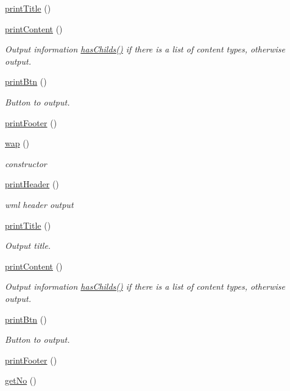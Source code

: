 \begin{DoxyCompactItemize}
\hyperlink{classwap_a048fa1324853c9d69e795c7d34f7ad8b}{print\-Title} ()
\item 
\hyperlink{classwap_a1edebe2b6a90ec08ab149ad2b2866dbd}{print\-Content} ()
\begin{DoxyCompactList}\small\item\em Output information \hyperlink{classmobileXE_a680f6a6b774bf12be4c67b6a9215f1ea}{has\-Childs()} if there is a list of content types, otherwise output. \end{DoxyCompactList}\item 
\hyperlink{classwap_a47437aad53e77ce53aebb4db6240cc38}{print\-Btn} ()
\begin{DoxyCompactList}\small\item\em Button to output. \end{DoxyCompactList}\item 
\hyperlink{classwap_a1fd1c1dca866c9b6653499cabf124980}{print\-Footer} ()
\item 
\hyperlink{classwap_a7b4befeef8257c63a0ffe3012a84560b}{wap} ()
\begin{DoxyCompactList}\small\item\em constructor \end{DoxyCompactList}\item 
\hyperlink{classwap_a402c6a180ae759c7a173a67441dfb716}{print\-Header} ()
\begin{DoxyCompactList}\small\item\em wml header output \end{DoxyCompactList}\item 
\hyperlink{classwap_a048fa1324853c9d69e795c7d34f7ad8b}{print\-Title} ()
\begin{DoxyCompactList}\small\item\em Output title. \end{DoxyCompactList}\item 
\hyperlink{classwap_a1edebe2b6a90ec08ab149ad2b2866dbd}{print\-Content} ()
\begin{DoxyCompactList}\small\item\em Output information \hyperlink{classmobileXE_a680f6a6b774bf12be4c67b6a9215f1ea}{has\-Childs()} if there is a list of content types, otherwise output. \end{DoxyCompactList}\item 
\hyperlink{classwap_a47437aad53e77ce53aebb4db6240cc38}{print\-Btn} ()
\begin{DoxyCompactList}\small\item\em Button to output. \end{DoxyCompactList}\item 
\hyperlink{classwap_a1fd1c1dca866c9b6653499cabf124980}{print\-Footer} ()
\item 
\hyperlink{classwap_a4ac2316bf5cb56e0c351a97e04142e28}{get\-No} ()
\end{DoxyCompactItemize}

